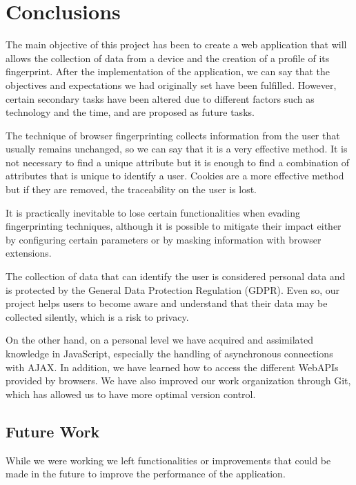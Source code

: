 \chapter{Conclusions}
\label{ch:conclusions}
The main objective of this project has been to create a web application that will allows the collection of data from a device and the creation of a profile of its fingerprint. After the implementation of the application, we can say that the objectives and expectations we had originally set have been fulfilled. However, certain secondary tasks have been altered due to different factors such as technology and the time, and are proposed as future tasks. \par

The technique of browser fingerprinting collects information from the user that usually remains unchanged, so we can say that it is a very effective method. It is not necessary to find a unique attribute but it is enough to find a combination of attributes that is unique to identify a user. Cookies are a more effective method but if they are removed, the traceability on the user is lost. \par 

It is practically inevitable to lose certain functionalities when evading fingerprinting techniques, although it is possible to mitigate their impact either by configuring certain parameters or by masking information with browser extensions. \par 

The collection of data that can identify the user is considered personal data and is protected by the General Data Protection Regulation (GDPR). Even so, our project helps users to become aware and understand that their data may be collected silently, which is a risk to privacy. \par

On the other hand, on a personal level we have acquired and assimilated knowledge in JavaScript, especially the handling of asynchronous connections with AJAX. In addition, we have learned how to access the different WebAPIs provided by browsers.
We have also improved our work organization through Git, which has allowed us to have more optimal version control. \par

\section{Future Work}

While we were working we left functionalities or improvements that could be made in the future to improve the performance of the application.

